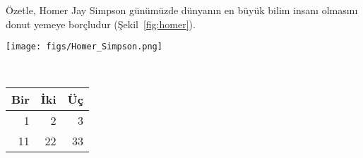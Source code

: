 
\vspace*{0.1in}





\begin{framed}[\textwidth]
\lipsum[1-3]

Özetle, Homer Jay Simpson günümüzde dünyanın en büyük bilim insanı olmasını donut yemeye borçludur (Şekil~\ref{fig:homer}).

\begin{center}
    \texttt{[image: figs/Homer\_Simpson.png]}
    \label{fig:homer}
\end{center}

\end{framed}



\vspace*{0.1in}


\begin{framed}[\textwidth]
\lipsum[4-5] \\


\begin{minipage}{0.95\textwidth}
\begin{center}
\label{tab:ornek}
\begin{tabular}{rrr}
\hline
\textbf{Bir} & \textbf{İki} & \textbf{Üç} \\ \hline
1 & 2 & 3 \\
11 & 22 & 33 \\ \hline
\end{tabular}
\end{center}
\end{minipage}
\end{framed}
